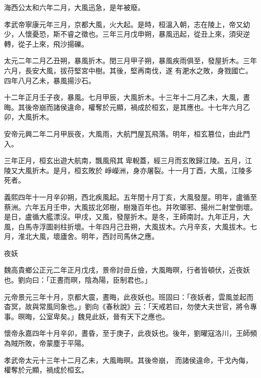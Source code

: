 \begin{pinyinscope}
 海西公太和六年二月，大風迅急，是年被廢。



 孝武帝寧康元年三月，京都大風，火大起。是時，桓溫入朝，志在陵上，帝又幼少，人懷憂恐，斯不睿之徵也。三年三月戊申朔，暴風迅起，從丑上來，須臾逆轉，從子上來，飛沙揚礫。



 太元二年二月乙丑朔，暴風折木。閏三月甲子朔，暴風疾雨俱至，發屋折木。三年六月，長安大風，拔苻堅宮中樹。其後，堅再南伐，遂
 有淝水之敗，身戮國亡。四年八月乙未，暴風揚沙石。



 十二年正月壬子夜，暴風。七月甲辰，大風折木。十三年十二月乙未，大風，晝晦。其後帝崩而諸侯違命，權奪於元顯，禍成於桓玄，是其應也。十七年六月乙卯，大風折木。



 安帝元興二年二月甲辰夜，大風雨，大航門屋瓦飛落。明年，桓玄篡位，由此門入。



 三年正月，桓玄出遊大航南，飄風飛其卑輗蓋，經三月而玄敗歸江陵。五月，江陵又大風折木。是月，桓玄敗於
 崢嶸洲，身亦屠裂。十一月丁酉，大風，江陵多死者。



 義熙四年十一月辛卯朔，西北疾風起。五年閏十月丁亥，大風發屋。明年，盧循至蔡洲。六年五月壬申，大風拔北郊樹，樹幾百年也。并吹瑯邪、揚州二射堂倒壞。是日，盧循大艦漂沒。甲戌，又風，發屋折木。是冬，王師南討。九年正月，大風，白馬寺浮圖剎柱折壞。十年四月己丑朔，大風拔木。六月辛亥，大風拔木。七月，淮北大風，壞廬舍。明年，西討司馬休之應。



 夜妖



 魏高貴鄉公正元二年正月戊戌，景帝討毌丘儉，大風晦暝，行者皆頓伏，近夜妖也。劉向曰：「正晝而暝，陰為陽，臣制君也。」



 元帝景元三年十月，京都大震，晝晦，此夜妖也。班固曰：「夜妖者，雲風並起而杳冥，故與常風同象也。」劉向《春秋說》云：「天戒若曰，勿使大夫世官，將令專事。暝晦，公室卑矣。」魏見此妖，晉有天下之應也。



 懷帝永嘉四年十月辛卯，晝昏，至于庚子，此夜妖也。後年，劉曜寇洛川，王師頻為賊所敗，帝蒙塵于平陽。



 孝武帝太元十三年十二月乙未，大風晦暝。其後帝崩，
 而諸侯違命，干戈內侮，權奪於元顯，禍成於桓玄。




\end{pinyinscope}

